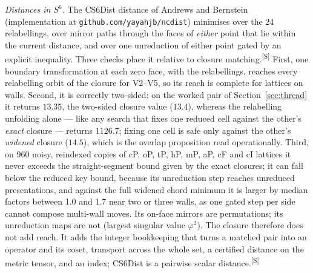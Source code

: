 \documentclass[preprint,pdf]{iucr}          %
\makeatletter
\newcommand{\chk}[1]{\textsuperscript{[S\@nameuse{zn@#1}]}}
\makeatother
\begin{document}
\emph{Distances in $S^6$.} The CS6Dist distance of Andrews and Bernstein (implementation at \texttt{github.com/yayahjb/ncdist}) minimises over the 24 relabellings, over mirror paths through the faces of \emph{either} point that lie within the current distance, and over one unreduction of either point gated by an explicit inequality. Three checks place it relative to closure matching.\chk{z:s6dist} First, one boundary transformation at each zero face, with the relabellings, reaches every relabelling orbit of the closure for V2--V5, so its reach is complete for lattices on walls. Second, it is correctly two-sided: on the worked pair of Section~\ref{sec:thread} it returns $13.35$, the two-sided closure value ($13.4$), whereas the relabelling unfolding alone --- like any search that fixes one reduced cell against the other's \emph{exact} closure --- returns $1126.7$; fixing one cell is safe only against the other's \emph{widened} closure ($14.5$), which is the overlap proposition read operationally. Third, on 960 noisy, reindexed copies of cP, oP, tP, hP, mP, aP, cF and cI lattices it never exceeds the straight-segment bound given by the exact closures; it can fall below the reduced key bound, because its unreduction step reaches unreduced presentations, and against the full widened chord minimum it is larger by median factors between 1.0 and 1.7 near two or three walls, as one gated step per side cannot compose multi-wall moves. Its on-face mirrors are permutations; its unreduction maps are not (largest singular value $\varphi^2$). The closure therefore does not add reach. It adds the integer bookkeeping that turns a matched pair into an operator and its coset, transport across the whole set, a certified distance on the metric tensor, and an index; CS6Dist is a pairwise scalar distance.\chk{z:s6dist}
\end{document}
